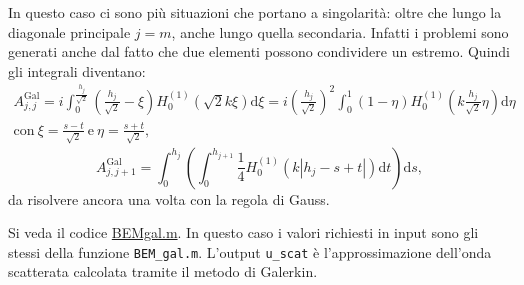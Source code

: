 In questo caso ci sono più situazioni che portano a singolarità: oltre che lungo la diagonale principale $j=m$, anche lungo quella secondaria. Infatti i problemi sono generati anche dal fatto che due elementi possono condividere un estremo. Quindi gli integrali diventano:
\begin{multline}
	A_{j,j}^{\text{Gal}} = i \int_{0}^{\frac{h_j}{\sqrt{2}}} \left( \frac{h_j}{\sqrt{2}} - \xi \right) H^{(1)}_0 (\sqrt{2} k \xi) \mathrm{d}\xi = i \left( \frac{h_j}{\sqrt{2}} \right) ^2 \int_0^1 (1-\eta) H^{(1)}_0 (k \frac{h_j}{\sqrt{2}} \eta) \mathrm{d}\eta \\
	\text{con} \ \xi = \frac{s-t}{\sqrt{2}} \ \text{e} \ \eta = \frac{s+t}{\sqrt{2}},
\end{multline}
\begin{equation}
	A_{j,j+1}^{\text{Gal}} = \int_0^{h_j} \left( \int_0^{h_{j+1}} \frac{1}{4} H^{(1)}_0 (k |h_j - s + t|)\mathrm{d}t \right) \mathrm{d}s,
\end{equation}
da risolvere ancora una volta con la regola di Gauss.


Si veda il codice \href{https://github.com/Daldossi/BEM/blob/main/BEM_gal.m}{BEMgal.m}.
In questo caso i valori richiesti in input sono gli stessi della funzione \verb|BEM_gal.m|. L'output \verb|u_scat| è l'approssimazione dell'onda scatterata calcolata tramite il metodo di Galerkin.


